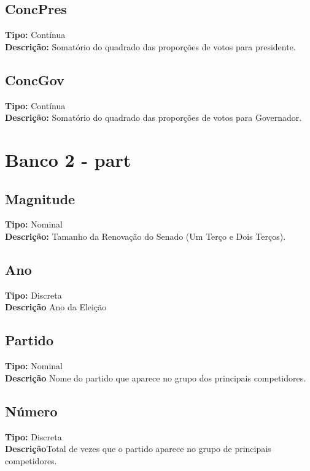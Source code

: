 \documentclass{article}\usepackage[]{graphicx}\usepackage[]{color}
\begin{document}
		\subsection{ConcPres}
		{\bf Tipo:} Contínua \\
		{\bf Descrição:} Somatório do quadrado das proporções de votos para presidente.\\

		\subsection{ConcGov}
		{\bf Tipo:} Contínua \\
		{\bf Descrição:} Somatório do quadrado das proporções de votos para Governador.\\


		\section{Banco 2 - part}

		\subsection{Magnitude}
		{\bf Tipo:} Nominal \\
		{\bf Descrição:} Tamanho da Renovação do Senado (Um Terço e Dois Terços).\\

		\subsection{Ano}
		{\bf Tipo:} Discreta \\
		{\bf Descrição} Ano da Eleição \\

		\subsection{Partido}
		{\bf Tipo:} Nominal \\
		{\bf Descrição} Nome do partido que aparece no grupo dos principais competidores.\\

		\subsection{Número}
		{\bf Tipo:} Discreta \\
		{\bf Descrição}Total de vezes que o partido aparece no grupo de principais competidores.\\
\end{document}
